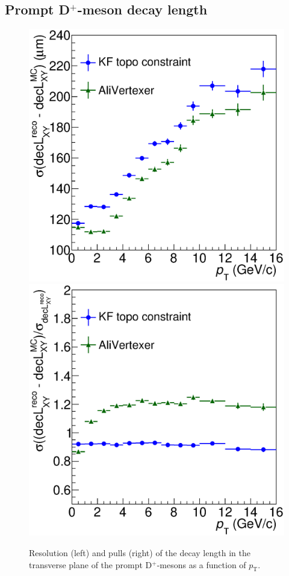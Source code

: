 \documentclass[b5paper,10pt,twoside,oldstyle,classica]{toptesi}
\newcommand{\pt}{p_\text{T}}
\begin{document}
\subsection{Prompt D$^+$-meson decay length}
\begin{figure}[b]
\begin{center}
{\includegraphics[scale = 0.28]{ResDecL.eps}}
\hspace{0.cm}
{\includegraphics[scale = 0.28]{PullsDecL.eps}}
\caption{Resolution (left) and pulls (right) of the decay length in the transverse plane of the prompt D$^+$-mesons as a function of $\pt$.}
\label{KF_decL}
\end{center}
\end{figure} 
\end{document}
